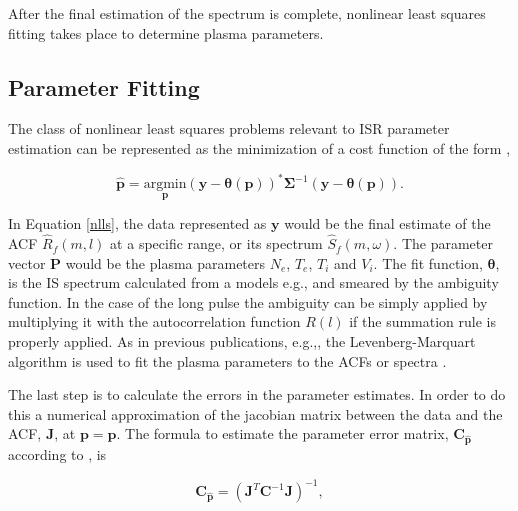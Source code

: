 After the final estimation of the spectrum is complete, nonlinear least squares fitting takes place to determine plasma parameters.  

\subsection{Parameter Fitting}
The class of nonlinear least squares problems relevant to ISR parameter estimation can be represented as the minimization of a cost function of the form \cite{kayvol1},

\begin{equation}
	\mathbf{\hat{p}}= \underset{\mathbf{p}}{\text{argmin}} (\mathbf{y}-\bm{\theta}(\mathbf{p}))^*\bm{\Sigma}^{-1}(\mathbf{y}-\bm{\theta}(\mathbf{p})).
\label{nlls}
\end{equation}

In Equation \ref{nlls}, the data represented as $\mathbf{y}$ would be the final estimate of the ACF $\widehat{R}_f(m,l)$ at a specific range, or its spectrum $\widehat{S}_f(m,\omega)$. The parameter vector $\mathbf{P}$ would be the plasma parameters $N_e$, $T_e$, $T_i$ and $V_i$. The fit function, $\bm{\theta}$, is the IS spectrum calculated from a models e.g., \cite{kudeki:milla:1} and smeared by the ambiguity function. In the case of the long pulse the ambiguity can be simply applied by multiplying it with the autocorrelation function $R(l)$ if the summation rule is properly applied. As in previous publications, e.g.,\cite{nikoukar2008}, the Levenberg-Marquart algorithm is used to fit the plasma parameters to the ACFs or spectra \cite{levenberg1944,marquardt:1963}.

The last step is to calculate the errors in the parameter estimates. In order to do this a numerical approximation of the jacobian matrix between the data and the ACF, $\mathbf{J}$, at $\mathbf{p}=\mathbf{\hat{p}}$. The formula to estimate the parameter error matrix, $\mathbf{C}_{\mathbf{\hat{p}}}$ according to \cite{Hysell:2000cq}, is


\begin{equation}
\label{eqn:jacinv}
\mathbf{C}_{\mathbf{\hat{p}}}=(\mathbf{J}^T \mathbf{C}^{-1}\mathbf{J})^{-1},
\end{equation}

